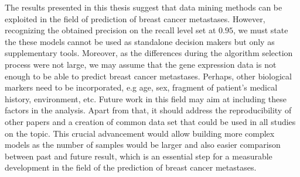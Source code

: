 \documentclass[shortabstract, english, mgr]{iithesis}
\begin{document}
The results presented in this thesis suggest that data mining methods can be exploited in the field of prediction of breast cancer metastases. However, recognizing the obtained precision on the recall level set at $0.95$, we must state the these models cannot be used as standalone decision makers but only as supplementary tools. Moreover, as the differences during the algorithm selection process were not large, we may assume that the gene expression data is not enough to be able to predict breast cancer metastases. Perhaps, other biological markers need to be incorporated, e.g age, sex, fragment of patient's medical history, environment, etc. Future work in this field may aim at including these factors in the analysis. Apart from that, it should address the reproducibility of other papers and a creation of common data set that could be used in all studies on the topic. This crucial advancement would allow building more complex models as the number of samples would be larger and also easier comparison between past and future result, which is an essential step for a measurable development in the field of the prediction of breast cancer metastases.



\end{document}
